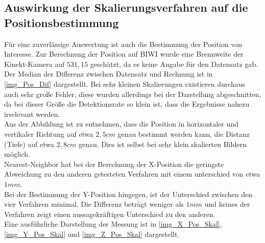 \subsection{Auswirkung der Skalierungsverfahren auf die Positionsbestimmung}
Für eine zuverlässige Auswertung ist auch die Bestimmung der Position von Interesse. Zur Berechnung der Position auf BIWI wurde eine Brennweite der Kinekt-Kamera auf $531,15$ geschätzt, da es keine Angabe für den Datensatz gab.\\
Der Median der Differenz zwischen Datensatz und Rechnung ist in \autoref{img_Pos_Dif} dargestellt. Bei sehr kleinen Skalierungen existieren durchaus auch sehr große Fehler, diese wurden allerdings bei der Darstellung abgeschnitten, da bei dieser Größe die Detektionsrate so klein ist, dass die Ergebnisse nahezu irrelevant werden.\\
Aus der Abbildung ist zu entnehmen, dass die Position in horizontaler und vertikaler Richtung auf etwa $2,5cm$ genau bestimmt werden kann, die Distanz (Tiefe) auf etwa $2,8cm$ genau. Dies ist selbst bei sehr klein skalierten Bildern möglich.\\
Nearest-Neighbor hat bei der Berechnung der X-Position die geringste Abweichung zu den anderen getesteten Verfahren mit einem unterschied von etwa $1mm$.\\
Bei der Bestimmung der Y-Position hingegen, ist der Unterschied zwischen den vier Verfahren minimal.
\newpage
Die Differenz beträgt weniger als $1mm$ und keines der Verfahren zeigt einen aussagekräftigen Unterschied zu den anderen.\\
Eine ausführliche Darstellung der Messung ist in \autoref{img_X_Pos_Skal}, \autoref{img_Y_Pos_Skal} und \autoref{img_Z_Pos_Skal} dargestellt.
